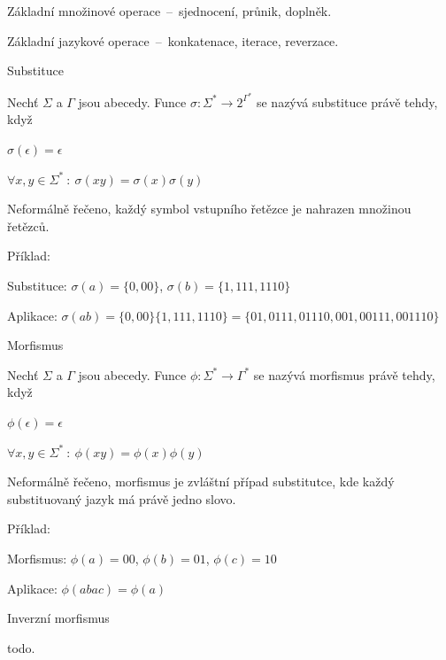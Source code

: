 \begin{compactitem}
    \item Základní množinové operace~--~sjednocení, průnik, doplněk.

    \item Základní jazykové operace~--~konkatenace, iterace, reverzace.

    \item Substituce \begin{compactitem}
        \item Nechť $\Sigma$ a $\Gamma$ jsou abecedy. Funce $\sigma : \Sigma^* \rightarrow 2^{\Gamma^*}$ se nazývá substituce právě tehdy, když \begin{compactitem}
            \item $\sigma(\epsilon) = \epsilon$
            \item $\forall x, y \in \Sigma^* ~:~ \sigma(xy) = \sigma(x) \sigma(y)$
        \end{compactitem}
        \item Neformálně řečeno, každý symbol vstupního řetězce je nahrazen množinou řetězců.
        \item Příklad: \begin{compactitem}
            \item Substituce: $\sigma(a) = \{0, 00\}$, $\sigma(b) = \{1, 111, 1110\}$
            \item Aplikace: $\sigma(ab) = \{0, 00\}\{1, 111, 1110\} = \{ 01, 0111, 01110, 001, 00111, 001110 \}$
        \end{compactitem}
    \end{compactitem}

    \item Morfismus \begin{compactitem}
        \item Nechť $\Sigma$ a $\Gamma$ jsou abecedy. Funce $\phi : \Sigma^* \rightarrow \Gamma^*$ se nazývá morfismus právě tehdy, když \begin{compactitem}
            \item $\phi(\epsilon) = \epsilon$
            \item $\forall x, y \in \Sigma^* ~:~ \phi(xy) = \phi(x) \phi(y)$
        \end{compactitem}
        \item Neformálně řečeno, morfismus je zvláštní případ substitutce, kde každý substituovaný jazyk má právě jedno slovo.
        \item Příklad: \begin{compactitem}
            \item Morfismus: $\phi(a) = 00$, $\phi(b) = 01$, $\phi(c) = 10$
            \item Aplikace: $\phi(abac) = \phi(a) $
        \end{compactitem}
    \end{compactitem}

    \item Inverzní morfismus \begin{compactitem}
        \item todo.
    \end{compactitem}
\end{compactitem}

